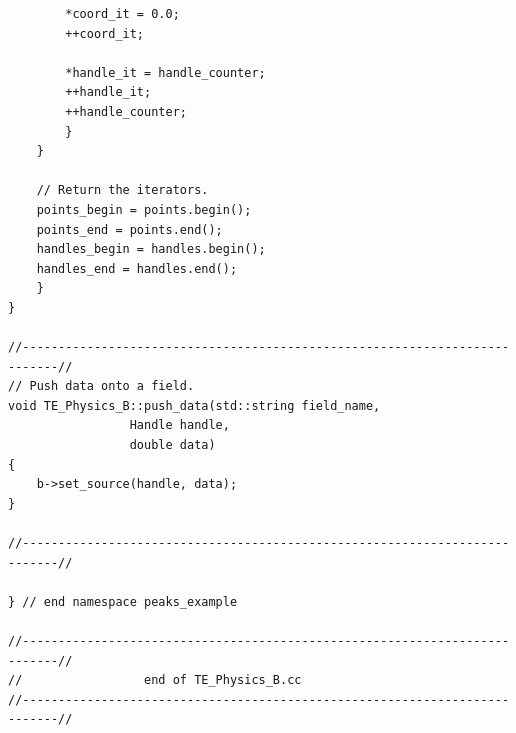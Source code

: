 \documentclass[letterpaper]{article}
\begin{document}
\begin{lstlisting}
		*coord_it = 0.0;
		++coord_it;

		*handle_it = handle_counter;
		++handle_it;
		++handle_counter;
	    }
	}

	// Return the iterators.
	points_begin = points.begin();
	points_end = points.end();
	handles_begin = handles.begin();
	handles_end = handles.end();
    }
}

//---------------------------------------------------------------------------//
// Push data onto a field.
void TE_Physics_B::push_data(std::string field_name,
			     Handle handle, 
			     double data)
{
    b->set_source(handle, data);
}

//---------------------------------------------------------------------------//

} // end namespace peaks_example

//---------------------------------------------------------------------------//
//                 end of TE_Physics_B.cc
//---------------------------------------------------------------------------//
\end{lstlisting}

\pagebreak


\end{document}
